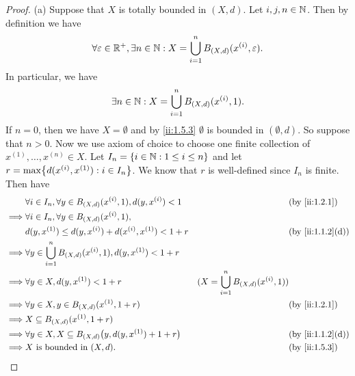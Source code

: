 \begin{proof}{(a)}
  Suppose that \(X\) is totally bounded in \((X, d)\).
  Let \(i, j, n \in \mathbb{N}\).
  Then by definition we have
  \[
    \forall \varepsilon \in \mathbb{R}^+, \exists n \in \mathbb{N} : X = \bigcup_{i = 1}^n B_{(X, d)}(x^{(i)}, \varepsilon).
  \]
  In particular, we have
  \[
    \exists n \in \mathbb{N} : X = \bigcup_{i = 1}^n B_{(X, d)}(x^{(i)}, 1).
  \]
  If \(n = 0\), then we have \(X = \emptyset\) and by \cref{ii:1.5.3} \(\emptyset\) is bounded in \((\emptyset, d)\).
  So suppose that \(n > 0\).
  Now we use axiom of choice to choose one finite collection of \(x^{(1)}, \dots, x^{(n)} \in X\).
  Let \(I_n = \left\lbrace i \in \mathbb{N} : 1 \leq i \leq n\right\rbrace\) and let \(r = \max\set{d(x^{(i)}, x^{(1)}) : i \in I_n}\).
  We know that \(r\) is well-defined since \(I_n\) is finite.
  Then have
  \begin{align*}
             & \forall i \in I_n, \forall y \in B_{(X, d)}(x^{(i)}, 1), d(y, x^{(i)}) < 1    &                                                & \by{ii:1.2.1}    \\
    \implies & \forall i \in I_n, \forall y \in B_{(X, d)}(x^{(i)}, 1),                                                                                       \\
             & d(y, x^{(1)}) \leq d(y, x^{(i)}) + d(x^{(i)}, x^{(1)}) < 1 + r                &                                                & \by{ii:1.1.2}[d] \\
    \implies & \forall y \in \bigcup_{i = 1}^n B_{(X, d)}(x^{(i)}, 1), d(y, x^{(1)}) < 1 + r                                                                  \\
    \implies & \forall y \in X, d(y, x^{(1)}) < 1 + r                                        & (X = \bigcup_{i = 1}^n B_{(X, d)}(x^{(i)}, 1))                 \\
    \implies & \forall y \in X, y \in B_{(X, d)}(x^{(1)}, 1 + r)                             &                                                & \by{ii:1.2.1}    \\
    \implies & X \subseteq B_{(X, d)}(x^{(1)}, 1 + r)                                                                                                         \\
    \implies & \forall y \in X, X \subseteq B_{(X, d)}\big(y, d(y, x^{(1)}) + 1 + r\big)     &                                                & \by{ii:1.1.2}[d] \\
    \implies & X \text{ is bounded in } (X, d).                                              &                                                & \by{ii:1.5.3}
  \end{align*}
\end{proof}

